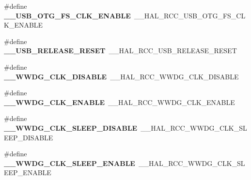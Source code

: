 \begin{DoxyCompactItemize}
\item 
\hypertarget{group___h_a_l___r_c_c___aliased_gaf4dca51b5f2f6a142fdffc063f68787f}{\#define {\bfseries \-\_\-\-\_\-\-U\-S\-B\-\_\-\-O\-T\-G\-\_\-\-F\-S\-\_\-\-C\-L\-K\-\_\-\-E\-N\-A\-B\-L\-E}~\-\_\-\-\_\-\-H\-A\-L\-\_\-\-R\-C\-C\-\_\-\-U\-S\-B\-\_\-\-O\-T\-G\-\_\-\-F\-S\-\_\-\-C\-L\-K\-\_\-\-E\-N\-A\-B\-L\-E}\label{group___h_a_l___r_c_c___aliased_gaf4dca51b5f2f6a142fdffc063f68787f}

\item 
\hypertarget{group___h_a_l___r_c_c___aliased_ga6fb50c3ef9ee8429bcded2b41c75a55e}{\#define {\bfseries \-\_\-\-\_\-\-U\-S\-B\-\_\-\-R\-E\-L\-E\-A\-S\-E\-\_\-\-R\-E\-S\-E\-T}~\-\_\-\-\_\-\-H\-A\-L\-\_\-\-R\-C\-C\-\_\-\-U\-S\-B\-\_\-\-R\-E\-L\-E\-A\-S\-E\-\_\-\-R\-E\-S\-E\-T}\label{group___h_a_l___r_c_c___aliased_ga6fb50c3ef9ee8429bcded2b41c75a55e}

\item 
\hypertarget{group___h_a_l___r_c_c___aliased_ga17c18790ccc24f556cd518f5c8ba26ec}{\#define {\bfseries \-\_\-\-\_\-\-W\-W\-D\-G\-\_\-\-C\-L\-K\-\_\-\-D\-I\-S\-A\-B\-L\-E}~\-\_\-\-\_\-\-H\-A\-L\-\_\-\-R\-C\-C\-\_\-\-W\-W\-D\-G\-\_\-\-C\-L\-K\-\_\-\-D\-I\-S\-A\-B\-L\-E}\label{group___h_a_l___r_c_c___aliased_ga17c18790ccc24f556cd518f5c8ba26ec}

\item 
\hypertarget{group___h_a_l___r_c_c___aliased_ga57311d1dc58aaf3d021286cc3bbb9d29}{\#define {\bfseries \-\_\-\-\_\-\-W\-W\-D\-G\-\_\-\-C\-L\-K\-\_\-\-E\-N\-A\-B\-L\-E}~\-\_\-\-\_\-\-H\-A\-L\-\_\-\-R\-C\-C\-\_\-\-W\-W\-D\-G\-\_\-\-C\-L\-K\-\_\-\-E\-N\-A\-B\-L\-E}\label{group___h_a_l___r_c_c___aliased_ga57311d1dc58aaf3d021286cc3bbb9d29}

\item 
\hypertarget{group___h_a_l___r_c_c___aliased_gac6fa67df82ed82aaafc18a52a39a65a2}{\#define {\bfseries \-\_\-\-\_\-\-W\-W\-D\-G\-\_\-\-C\-L\-K\-\_\-\-S\-L\-E\-E\-P\-\_\-\-D\-I\-S\-A\-B\-L\-E}~\-\_\-\-\_\-\-H\-A\-L\-\_\-\-R\-C\-C\-\_\-\-W\-W\-D\-G\-\_\-\-C\-L\-K\-\_\-\-S\-L\-E\-E\-P\-\_\-\-D\-I\-S\-A\-B\-L\-E}\label{group___h_a_l___r_c_c___aliased_gac6fa67df82ed82aaafc18a52a39a65a2}

\item 
\hypertarget{group___h_a_l___r_c_c___aliased_gafe0cf8a80f682f75863f2058608d0567}{\#define {\bfseries \-\_\-\-\_\-\-W\-W\-D\-G\-\_\-\-C\-L\-K\-\_\-\-S\-L\-E\-E\-P\-\_\-\-E\-N\-A\-B\-L\-E}~\-\_\-\-\_\-\-H\-A\-L\-\_\-\-R\-C\-C\-\_\-\-W\-W\-D\-G\-\_\-\-C\-L\-K\-\_\-\-S\-L\-E\-E\-P\-\_\-\-E\-N\-A\-B\-L\-E}\label{group___h_a_l___r_c_c___aliased_gafe0cf8a80f682f75863f2058608d0567}


\end{DoxyCompactItemize}
